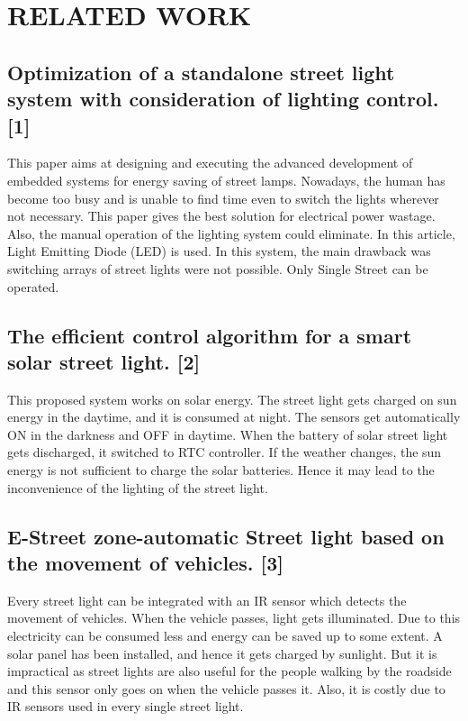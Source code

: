 \documentclass[conference]{IEEEtran}
\begin{document}
\section{RELATED WORK}

\subsection{Optimization of a standalone street light system
with consideration of lighting control. [1] }
This paper aims at designing and executing the
advanced development of embedded systems for
energy saving of street lamps. Nowadays, the human
has become too busy and is unable to find time even
to switch the lights wherever not necessary. This
paper gives the best solution for electrical power
wastage. Also, the manual operation of the lighting
system could eliminate. In this article, Light Emitting
Diode (LED) is used. In this system, the main
drawback was switching arrays of street lights were
not possible. Only Single Street can be operated.
\subsection{The efficient control algorithm for a smart solar
street light. [2] }
This proposed system works on solar energy. The
street light gets charged on sun energy in the daytime,
and it is consumed at night. The sensors get
automatically ON in the darkness and OFF in daytime.
When the battery of solar street light gets discharged,
it switched to RTC controller. If the weather changes,
the sun energy is not sufficient to charge the solar
batteries. Hence it may lead to the inconvenience of
the lighting of the street light. 

\subsection{E-Street zone-automatic Street light based on the
movement of vehicles. [3] }
Every street light can be integrated with an IR sensor
which detects the movement of vehicles. When the
vehicle passes, light gets illuminated. Due to this
electricity can be consumed less and energy can be
saved up to some extent. A solar panel has been
installed, and hence it gets charged by sunlight. But it
is impractical as street lights are also useful for the
people walking by the roadside and this sensor only
goes on when the vehicle passes it. Also, it is costly
due to IR sensors used in every single street light. 
\end{document}
